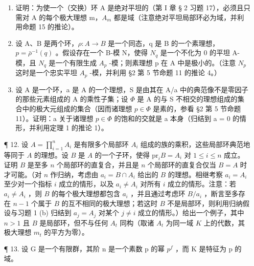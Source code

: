 \begin{enumerate}
\def\labelenumi{\arabic{enumi}.}
\setcounter{enumi}{8}
\item
  证明：为使一个（交换）环 A 是绝对平坦的（第 I 章 § 2 习题 17），必须且只需对 A 的每个极大理想 m，\(A_{m}\) 都是域（注意绝对平坦局部环必为域，并利用命题 15 的推论）。
\item
  设 A、B 是两个环，\(\rho: A \rightarrow B\) 是一个同态，q 是 B 的一个素理想，\(p = \bar{\rho}^{-1}(q)\) 。假设存在一个 B-模 N，使得 \(N_{q}\) 是一个不化为 0 的平坦 A-模，且 \(N_{q}\) 是一个有限生成 \(A_{p}\) -模；则素理想 p 在 A 中是极小的。（注意 \(N_{p}\) 这时是一个忠实平坦 \(A_{p}\) -模，并利用 §2 第 5 节命题 11 的推论 4。）
\item
  设 A 是一个环，a 是 A 的一个理想，S 是由其在 A/a 中的典范像不是零因子的那些元素组成的 A 的乘性子集；设 \(\Phi\) 是 A 的与 S 不相交的理想组成的集合中的极大元组成的集合（因而诸理想 \(p \in \Phi\) 是素的，参看 §2 第 5 节命题 11）。证明：a 关于诸理想 \(p \in \Phi\) 的饱和的交就是 a 本身（归结到 a = 0 的情形，并利用定理 1 的推论 1）。
\end{enumerate}

¶ 12. 设 \(A = \prod_{i=1}^{n} A_i\) 是有限多个局部环 \(A_i\) 组成的族的乘积，这些局部环典范地等同于 \(A\) 的理想。设 \(B\) 是 \(A\) 的一个子环，使得 \(\text{pr}_i B = A_i\) 对 \(1 \leqslant i \leqslant n\) 成立。证明 \(B\) 是至多 \(n\) 个局部环的直复合，并且是 \(n\) 个局部环的直复合仅当 \(B = A\) 时才可能。（对 \(n\) 作归纳，考虑由 \(a_i = B \cap A_i\) 给出的 \(B\) 的理想。相继考察 \(a_i = A_i\) 至少对一个指标 \(i\) 成立的情形，以及 \(a_i \neq A_i\) 对所有 \(i\) 成立的情形。注意：若 \(a_i \neq A_i\) ，则 \(B\) 的每个极大理想都包含 \(a_i\) ，并且通过考虑环 \(B / a_i\) ，断言至多存在 \(n - 1\) 个属于 \(B\) 的互不相同的极大理想；若这时 \(B\) 不是局部环，则利用归纳假设与习题 1 (b) 归结到 \(a_j = A_j\) 对某个 \(j \neq i\) 成立的情形。）给出一个例子，其中 \(n > 1\) 且 \(B\) 是局部环，但不与任何 \(A_t\) 同构（取诸 \(A_t\) 为同一域 \(K\) 上的代数，其极大理想 \(m_t\) 的平方为零）。

¶ 13. 设 G 是一个有限群，其阶 n 是一个素数 p 的幂 \(p^{f}\) ，而 K 是特征为 p 的域。

